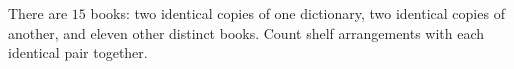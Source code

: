 There are $15$ books: two identical copies of one dictionary, two identical copies of another, and eleven other distinct books. Count shelf arrangements with each identical pair together.
